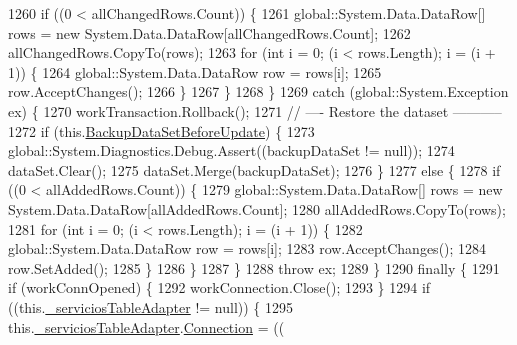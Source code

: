 \begin{DoxyCode}
1260                 \textcolor{keywordflow}{if} ((0 < allChangedRows.Count)) \{
1261                     global::System.Data.DataRow[] rows = \textcolor{keyword}{new} System.Data.DataRow[allChangedRows.Count];
1262                     allChangedRows.CopyTo(rows);
1263                     \textcolor{keywordflow}{for} (\textcolor{keywordtype}{int} i = 0; (i < rows.Length); i = (i + 1)) \{
1264                         global::System.Data.DataRow row = rows[i];
1265                         row.AcceptChanges();
1266                     \}
1267                 \}
1268             \}
1269             \textcolor{keywordflow}{catch} (global::System.Exception ex) \{
1270                 workTransaction.Rollback();
1271                 \textcolor{comment}{// ---- Restore the dataset -----------}
1272                 \textcolor{keywordflow}{if} (this.\hyperlink{class_proyecto___integrador__3_1_1ds_servicios_table_adapters_1_1_table_adapter_manager_a746392e04b3bd5203f1e2ed6ab33595c}{BackupDataSetBeforeUpdate}) \{
1273                     global::System.Diagnostics.Debug.Assert((backupDataSet != null));
1274                     dataSet.Clear();
1275                     dataSet.Merge(backupDataSet);
1276                 \}
1277                 \textcolor{keywordflow}{else} \{
1278                     \textcolor{keywordflow}{if} ((0 < allAddedRows.Count)) \{
1279                         global::System.Data.DataRow[] rows = \textcolor{keyword}{new} System.Data.DataRow[allAddedRows.Count];
1280                         allAddedRows.CopyTo(rows);
1281                         \textcolor{keywordflow}{for} (\textcolor{keywordtype}{int} i = 0; (i < rows.Length); i = (i + 1)) \{
1282                             global::System.Data.DataRow row = rows[i];
1283                             row.AcceptChanges();
1284                             row.SetAdded();
1285                         \}
1286                     \}
1287                 \}
1288                 \textcolor{keywordflow}{throw} ex;
1289             \}
1290             \textcolor{keywordflow}{finally} \{
1291                 \textcolor{keywordflow}{if} (workConnOpened) \{
1292                     workConnection.Close();
1293                 \}
1294                 \textcolor{keywordflow}{if} ((this.\hyperlink{class_proyecto___integrador__3_1_1ds_servicios_table_adapters_1_1_table_adapter_manager_ac26b431a74f60f4ba1f8cc57cb5e75e2}{\_serviciosTableAdapter} != null)) \{
1295                     this.\hyperlink{class_proyecto___integrador__3_1_1ds_servicios_table_adapters_1_1_table_adapter_manager_ac26b431a74f60f4ba1f8cc57cb5e75e2}{\_serviciosTableAdapter}.\hyperlink{class_proyecto___integrador__3_1_1ds_servicios_table_adapters_1_1_servicios_table_adapter_afdc3759c0f8fd84ed6ae2943ee4855f5}{Connection} = ((

\end{DoxyCode}
